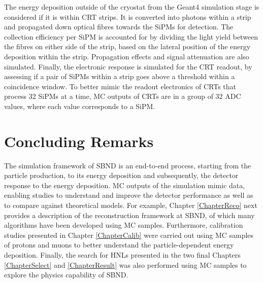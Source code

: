 The energy deposition outside of the cryostat from the Geant4 simulation stage is considered if it is within CRT strips.
It is converted into photons within a strip and propagated down optical fibres towards the SiPMs for detection.
The collection efficiency per SiPM is accounted for by dividing the light yield between the fibres on either side of the strip, based on the lateral position of the energy deposition within the strip.
Propagation effects and signal attenuation are also simulated.
Finally, the electronic response is simulated for the CRT readout, by assessing if a pair of SiPMs within a strip goes above a threshold within a coincidence window.
To better mimic the readout electronics of CRTs that process 32 SiPMs at a time, MC outputs of CRTs are in a group of 32 ADC values, where each value corresponds to a SiPM.

\section{Concluding Remarks}
\label{sec:sim_concluding_remarks}

The simulation framework of SBND is an end-to-end process, starting from the particle production, to its energy deposition and subsequently, the detector response to the energy deposition.
MC outputs of the simulation mimic data, enabling studies to understand and improve the detector performance as well as to compare against theoretical models.
For example, Chapter \ref{ChapterReco} next provides a description of the reconstruction framework at SBND, of which many algorithms have been developed using MC samples.
Furthermore, calibration studies presented in Chapter \ref{ChapterCalib} were carried out using MC samples of protons and muons to better understand the particle-dependent energy deposition.
Finally, the search for HNLs presented in the two final Chapters \ref{ChapterSelect} and \ref{ChapterResult} was also performed using MC samples to explore the physics capability of SBND.
